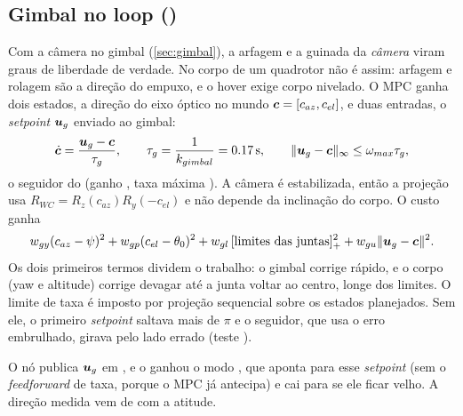 \subsection{Gimbal no loop ()}
\label{sec:ibvs_gimbal}
Com a câmera no gimbal (\autoref{sec:gimbal}), a arfagem e a guinada da \emph{câmera} viram graus de
liberdade de verdade. No corpo de um quadrotor não é assim: arfagem e rolagem são a direção do
empuxo, e o hover exige corpo nivelado. O MPC ganha dois estados, a direção do eixo óptico no mundo
$\bm{c}=[c_{az},c_{el}]$, e duas entradas, o \emph{setpoint} $\bm{u}_g$ enviado ao gimbal:
\begin{equation}
  \dot{\bm{c}}=\frac{\bm{u}_g-\bm{c}}{\tau_g},\qquad \tau_g=\frac{1}{k_{gimbal}}=\SI{0,17}{s},
  \qquad \|\bm{u}_g-\bm{c}\|_\infty\le\omega_{max}\tau_g,
\end{equation}
o seguidor do  (ganho , taxa máxima
). A câmera é estabilizada, então a projeção usa
$R_{WC}=R_z(c_{az})R_y(-c_{el})$ e não depende da inclinação do corpo. O custo ganha
\begin{equation}
  w_{gy}(c_{az}-\psi)^2+w_{gp}(c_{el}-\theta_0)^2+w_{gl}\,[\text{limites das juntas}]_+^2
  +w_{gu}\|\bm{u}_g-\bm{c}\|^2 .
\end{equation}
Os dois primeiros termos dividem o trabalho: o gimbal corrige rápido, e o corpo (yaw e altitude)
corrige devagar até a junta voltar ao centro, longe dos limites. O limite de taxa é imposto por
projeção sequencial sobre os estados planejados. Sem ele, o primeiro \emph{setpoint} saltava mais de
$\pi$ e o seguidor, que usa o erro embrulhado, girava pelo lado errado (teste
).

O nó publica $\bm{u}_g$ em , e o  ganhou o
modo , que aponta para esse \emph{setpoint} (sem o \emph{feedforward} de taxa, porque o MPC
já antecipa) e cai para  se ele ficar velho. A direção medida vem de
 com a atitude.

